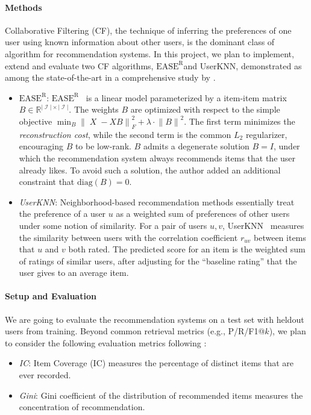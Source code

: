 \documentclass{article}
\DeclareMathOperator{\X}{\mathit{X}}
\DeclareMathOperator{\I}{\mathcal{I}}
\newcommand{\card}[1]{\ensuremath{\lvert {#1} \rvert}}
\newcommand{\easer}{$\text{EASE}^\text{R}$}
\newcommand{\userknn}{UserKNN\xspace}
\newcommand{\norm}[1]{\ensuremath{\lVert #1 \rVert}}
\begin{document}
\paragraph*{Methods}
Collaborative Filtering (CF), the technique of inferring the preferences of one
 user using known information about other users, is the dominant class of
 algorithm for recommendation systems.
In this project, we plan to implement, extend and evaluate two CF algorithms,
 \easer and \userknn, demonstrated as among the state-of-the-art in a
 comprehensive study by \citet{anelliTopNRecommendationAlgorithms2022}.

\begin{itemize}
	\item {\em \easer}:
	      \easer~\citep{steckEmbarrassinglyShallowAutoencoders2019}
	      is a linear model parameterized by a item-item matrix $B \in
		      \mathbb{R}^{\card{\I} \times \card{\I}}$.
	      The weights $B$ are optimized with respect to the simple objective $\min_B
		       \norm{\X - X B}_F^2 + \lambda \cdot \norm{B}^2$.
	      The first term minimizes the {\em reconstruction cost}, while the second term
	       is the common $L_2$ regularizer, encouraging $B$ to be low-rank.
	      $B$ admits a degenerate solution $B = I$, under which the
	      recommendation
	      system always recommends items that the user already likes.
	      To avoid such a solution, the author added an additional constraint that
	       $\mathrm{diag}(B) = 0$.

	      \item{\em \userknn}: Neighborhood-based recommendation methods
	      essentially
	      treat the preference of a user $u$ as a weighted sum of
	      preferences of other
	      users under some notion of similarity.
	      For a pair of users $u, v$,
	       \userknn~\citep{resnickGroupLensOpenArchitecture1994} measures the similarity
	       between users with the correlation coefficient $r_{uv}$ between items that $u$
	       and $v$ both rated.
	      The predicted score for an item is the weighted sum of ratings of similar
	       users, after adjusting for the ``baseline rating'' that the user gives to an
	       average item.
\end{itemize}

\paragraph*{Setup and Evaluation}
We are going to evaluate the recommendation systems on a test set with heldout
 users from training.
Beyond common retrieval metrics (e.g., P/R/F1@$k$), we plan to consider the
 following evaluation metrics following
 \citet{anelliTopNRecommendationAlgorithms2022}:  \begin{itemize} \item {\em
             IC}: Item Coverage (IC) measures the percentage of distinct items that are ever
 recorded.
\item {\em Gini}: Gini coefficient of the distribution of recommended items
measures the concentration of recommendation.
\end{itemize}

\newpage


\end{document}
